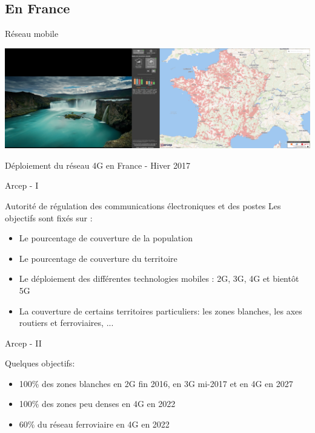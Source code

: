 \documentclass{beamer}
\begin{document}
\subsection{En France}
\begin{frame}{Réseau mobile}
  \centerline{\includegraphics[trim = 60cm 0cm 15cm 0cm, clip=true ,scale= 0.16]{4g.png}}
  \centerline{Déploiement du réseau 4G en France - Hiver 2017}
\end{frame}

\begin{frame}{Arcep - I}
\begin{block}{Autorité de régulation des communications électroniques et des postes}
Les objectifs sont fixés sur : 
\begin{itemize}
    \item Le pourcentage de couverture de la population
    \item Le pourcentage de couverture du territoire
    \item Le déploiement des différentes technologies mobiles : 2G, 3G, 4G et bientôt 5G
    \item La couverture de certains territoires particuliers: les zones blanches, les axes routiers et ferroviaires, ...
\end{itemize}
\end{block}
\end{frame}

\begin{frame}{Arcep - II}
\begin{block}{Quelques objectifs:}
\begin{itemize}
    \item 100\% des zones blanches en 2G fin 2016, en 3G mi-2017 et en 4G en 2027
    \item 100\% des zones peu denses en 4G en 2022
    \item 60\% du réseau ferroviaire en 4G en 2022
\end{itemize}
\end{block}
    
\end{frame}
\end{document}
